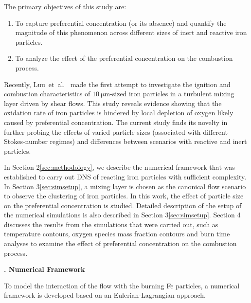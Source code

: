 \documentclass[twocolumn,10pt,dvipsnames]{article} %
\renewcommand{\section}%
              [1]%
              {%
               \bgroup%
               \flushleft%
               \small\bf%
               \refstepcounter{section}%
               \arabic{section}. #1%
               \par%
               \egroup%
              }%
\begin{document}
The primary objectives of this study are:
\begin{enumerate}
    \item To capture preferential concentration (or its absence) and quantify the magnitude of this phenomenon across different sizes of inert and reactive iron particles.
    \item To analyze the effect of the preferential concentration on the combustion process.
\end{enumerate}
Recently, Luu~et~al.~\cite{luu2024carrier} made the first attempt to investigate the ignition and combustion characteristics of $\SI{10}{\micro\meter}$-sized iron particles in a turbulent mixing layer driven by shear flows. This study reveals evidence showing that the oxidation rate of iron particles is hindered by local depletion of oxygen likely caused by preferential concentration. The current study finds its novelty in further probing the effects of varied particle sizes (associated with different Stokes-number regimes) and differences between scenarios with reactive and inert particles.

In Section 2\ref{sec:methodology}, we describe the numerical framework that was established to carry out DNS of reacting iron particles with sufficient complexity. In Section 3\ref{sec:simsetup}, a mixing layer is chosen as the canonical flow scenario to observe the clustering of iron particles. In this work, the effect of particle size on the preferential concentration is studied. Detailed description of the setup of the numerical simulations is also described in Section 3\ref{sec:simsetup}. Section 4 discusses the results from the simulations that were carried out, such as temperature contours, oxygen species mass fraction contours and burn time analyses to examine the effect of preferential concentration on the combustion process.

\section{Numerical Framework}\label{sec:methodology}\addvspace{10pt}

To model the interaction of the flow with the burning Fe particles, a numerical framework is developed based on an Eulerian-Lagrangian approach. 
\end{document}
